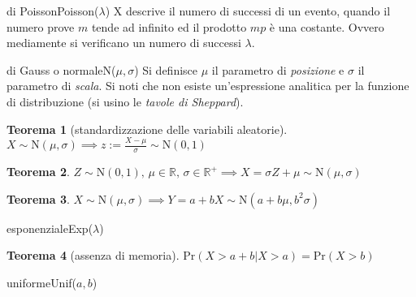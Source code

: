 \documentclass[
	,a4paper
	,12pt
	,oneside
]{article}
\newtheorem*{theorem}{Teorema}
\begin{document}
\begin{aleatoria}{di Poisson}{Poisson(\(\lambda\))}
	X descrive il numero di successi di un evento, quando il numero prove \(m\) tende ad infinito ed il prodotto \(mp\) è una costante. Ovvero mediamente si verificano un numero di successi \(\lambda\).

	\speranza{\lambda}
	\varianza{\lambda}
\end{aleatoria}

\begin{aleatoria}{di Gauss o normale}{N(\(\mu, \sigma\))}
	Si definisce \(\mu\) il parametro di \emph{posizione} e \(\sigma\) il parametro di \emph{scala}. Si noti che non esiste un'espressione analitica per la funzione di distribuzione (si usino le \emph{tavole di Sheppard}).

	\begin{theorem}[standardizzazione delle variabili aleatorie]
		\(X\sim\text{N}(\mu,\sigma)\implies z:=\frac{X-\mu}{\sigma}\sim\text{N}(0,1)\)
	\end{theorem}
	\begin{theorem}
		\(Z\sim\text{N}(0,1)\text{, }\mu\in\mathbb{R}\text{, }\sigma\in\mathbb{R}^+\implies X=\sigma Z+\mu\sim\text{N}(\mu,\sigma)\)
	\end{theorem}
	\begin{theorem}
		\(X\sim\text{N}(\mu,\sigma)\implies Y=a+bX\sim\text{N}(a+b\mu,b^2\sigma)\)
	\end{theorem}
	\speranza{\mu}
\end{aleatoria}

\begin{aleatoria}{esponenziale}{Exp(\(\lambda\))}

	\begin{theorem}[assenza di memoria]
		\(\text{Pr}(X>a+b|X>a) = \text{Pr}(X>b)\)
	\end{theorem}
\end{aleatoria}

\begin{aleatoria}{uniforme}{Unif(\(a, b\))}
	\densita{
		\begin{cases}
			\frac{1}{b-a} & \text{per } x \in (a, b] \\
			0 & \text{altrimenti}
		\end{cases}
	}

\end{aleatoria}
\end{document}

